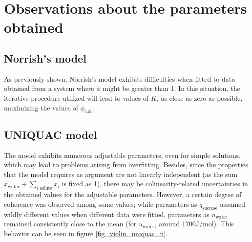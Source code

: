 \documentclass[
	12pt,				%
	openright,
	twoside,
	a4paper,			%
	brazil,			%
	french,				%
	english				%
	]{abntex2}
\begin{document}
\section{Observations about the parameters obtained}

\subsection{Norrish's model}

As previously shown, Norrish's model exhibits difficulties when fitted to data
obtained from a system where $\phi$ might be greater than 1. In this situation,
the iterative procedure utilized will lead to values of $K_i$ as close as zero as
possible, maximizing the values of $\phi_\text{calc}$.

\subsection{UNIQUAC model}

The model exhibits numerous adjustable parameters, even for simple
solutions, which may lead to problems arising from overfitting. Besides, since
the properties that the model requires as argument are not linearly independent
(as the sum $x_\text{water} + \sum_{i\text{ solute}}x_i$ is fixed as 1), there
may be colinearity-related uncertainties in the obtained values for the adjustable
parameters. However, a certain degree of coherence was observed among some values;
while parameters as $q_\text{sucrose}$ assumed wildly different values when different
data were fitted, parameters as $u_\text{water}$ remained consistently close
to the mean (for $u_\text{water}$, around 1700J/mol). This behavior can be
seen in figure \ref{fig_violin_uniquac_u}.
\end{document}
